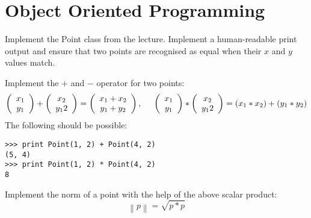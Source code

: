 \section*{Object Oriented Programming}

\begin{aufgabe}
\begin{teilaufgabe}
Implement the Point class from the lecture. Implement a human-readable print output and ensure that two points are recognised as equal when their $x$ and $y$ values match.
\end{teilaufgabe}
\begin{teilaufgabe}
Implement the $+$ and $-$ operator for two points:
\begin{displaymath}
\left(\begin{array}{c}
x_1\\
y_1
\end{array}\right)
+
\left(\begin{array}{c}
x_2\\
y_12
\end{array}\right)
=
\left(\begin{array}{c}
x_1 + x_2\\
y_1 + y_2
\end{array}\right), \hspace{5mm}
\left(\begin{array}{c}
x_1\\
y_1
\end{array}\right)
*
\left(\begin{array}{c}
x_2\\
y_12
\end{array}\right)
= (x_1 * x_2) + (y_1 * y_2)
\end{displaymath}
The following should be possible:
\begin{lstlisting}
>>> print Point(1, 2) + Point(4, 2)
(5, 4)
>>> print Point(1, 2) * Point(4, 2)
8
\end{lstlisting}
\end{teilaufgabe}

\begin{teilaufgabe}
Implement the norm of a point with the help of the above scalar product:
\begin{displaymath}
\left\| p\right\| = \sqrt{p*p}
\end{displaymath}
\end{teilaufgabe}
\end{aufgabe}


